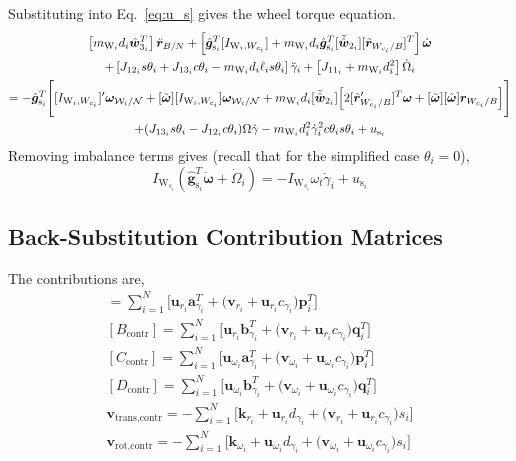 Substituting into Eq.~\eqref{eq:u_s} gives the wheel torque equation.
\begin{multline}
		\left[ m_{\text{W}_i}d_i\hat{\bm w}_{3_i}^T \right] \ddot{\bm r}_{B/N} + \left[ \hat{\bm g}_{\text{s}_i}^T[I_{\text{W}_i,W_{c_i}}] + m_{\text{W}_i}d_i\hat{\bm g}_{\text{s}_i}^T[\tilde{\hat{\bm w}}_{2_i}][\tilde{\bm{r}}_{W_{c_i}/B}]^T \right] \dot{\bm\omega}
		\\
		+\left[ J_{12_i}s\theta_i + J_{13_i}c\theta_i - m_{\text{W}_i}d_i\ell_is\theta_i \right] \ddot{\gamma}_i 
		+ \left[ J_{11_i}  + m_{\text{W}_i}d_i^2 \right] \dot{\Omega}_i
		\\
		=-\hat{\bm g}_{\text{s}_i}^T \Bigg[ [I_{\text{W}_i,W_{c_i}}]'\bm\omega_{\mathcal{W}_i/\cal N} + [\tilde{\bm{\omega}}][I_{\text{W}_i,W_{c_i}}]\bm\omega_{\mathcal{W}_i/\cal N}  + m_{\text{W}_i}d_i[\tilde{\hat{\bm w}}_{2_i}] \Big[ 2[\tilde{\bm{r}}'_{W_{c_i}/B}]^T\bm\omega + [\tilde{\bm\omega}][\tilde{\bm\omega}]\bm{r}_{W_{c_i}/B}
		\Big] \Bigg] \\+(J_{13_i}s\theta_i - J_{12_i}c\theta_i)\Omega\dot{\gamma} - m_{\text{W}_i}d_i^2\dot{\gamma}_i^2c\theta_is\theta_i
		+ u_{\text{s}_i}
\end{multline}  
Removing imbalance terms gives (recall that for the simplified case $\theta_i = 0$),
\begin{equation}
	I_{\text{W}_{s_i}}(\hat{\bm g}_{\text{s}_i}^T\dot{\bm\omega} + \dot{\Omega}_i)
	=-I_{\text{W}_{s_i}}\omega_t\dot{\gamma}_i + u_{\text{s}_i}
\label{eq:vscmgWheelTorqueSimple}
\end{equation} 


\subsection{Back-Substitution Contribution Matrices}
The contributions are,
\begin{gather}
[A_\text{contr}] =  \sum\limits_{i=1}^{N}\Big[\bm{u}_{r_i}\bm{a}_{\gamma_i}^T + \big(\bm{v}_{r_i} + \bm{u}_{r_i}c_{\gamma_i}\big)\bm{p}_i^T\Big]
\\
[B_\text{contr}] =  \sum\limits_{i=1}^{N}\Big[\bm{u}_{r_i}\bm{b}_{\gamma_i}^T + \big(\bm{v}_{r_i} + \bm{u}_{r_i}c_{\gamma_i}\big)\bm{q}_i^T\Big]
\\
[C_\text{contr}] = \sum\limits_{i=1}^{N}\Big[\bm{u}_{\omega_i}\bm{a}_{\gamma_i}^T + \big(\bm{v}_{\omega_i} + \bm{u}_{\omega_i}c_{\gamma_i}\big)\bm{p}_i^T\Big]
\\
[D_\text{contr}] = \sum\limits_{i=1}^{N}\Big[\bm{u}_{\omega_i}\bm{b}_{\gamma_i}^T + \big(\bm{v}_{\omega_i} + \bm{u}_{\omega_i}c_{\gamma_i}\big)\bm{q}_i^T\Big]
\\
\bm{v}_\text{trans,contr} =  -  \sum\limits_{i=1}^{N}\Big[\bm{k}_{r_i}+\bm{u}_{r_i}d_{\gamma_i} + \big(\bm{v}_{r_i} + \bm{u}_{r_i}c_{\gamma_i}\big)s_i\Big]
\\
\bm{v}_\text{rot,contr} = -  \sum\limits_{i=1}^{N}\Big[\bm{k}_{\omega_i} +\bm{u}_{\omega_i}d_{\gamma_i}+ \big(\bm{v}_{\omega_i} + \bm{u}_{\omega_i}c_{\gamma_i}\big)s_i\Big]
\end{gather}






